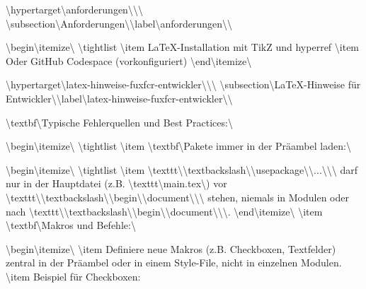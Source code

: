 \textbackslash{}hypertarget\textbackslash{}{anforderungen\textbackslash{}}\textbackslash{}{\textbackslash{}%
\textbackslash{}subsection\textbackslash{}{Anforderungen\textbackslash{}}\textbackslash{}label\textbackslash{}{anforderungen\textbackslash{}}\textbackslash{}}

\textbackslash{}begin\textbackslash{}{itemize\textbackslash{}}
\textbackslash{}tightlist
\textbackslash{}item
  LaTeX-Installation mit TikZ und hyperref
\textbackslash{}item
  Oder GitHub Codespace (vorkonfiguriert)
\textbackslash{}end\textbackslash{}{itemize\textbackslash{}}

\textbackslash{}hypertarget\textbackslash{}{latex-hinweise-fuxfcr-entwickler\textbackslash{}}\textbackslash{}{\textbackslash{}%
\textbackslash{}subsection\textbackslash{}{LaTeX-Hinweise für Entwickler\textbackslash{}}\textbackslash{}label\textbackslash{}{latex-hinweise-fuxfcr-entwickler\textbackslash{}}\textbackslash{}}

\textbackslash{}textbf\textbackslash{}{Typische Fehlerquellen und Best Practices:\textbackslash{}}

\textbackslash{}begin\textbackslash{}{itemize\textbackslash{}}
\textbackslash{}tightlist
\textbackslash{}item
  \textbackslash{}textbf\textbackslash{}{Pakete immer in der Präambel laden:\textbackslash{}}

  \textbackslash{}begin\textbackslash{}{itemize\textbackslash{}}
  \textbackslash{}tightlist
  \textbackslash{}item
    \textbackslash{}texttt\textbackslash{}{\textbackslash{}textbackslash\textbackslash{}{\textbackslash{}}usepackage\textbackslash{}\textbackslash{}{...\textbackslash{}\textbackslash{}}\textbackslash{}} darf nur in der Hauptdatei (z.B. \textbackslash{}texttt\textbackslash{}{main.tex\textbackslash{}}) vor \textbackslash{}texttt\textbackslash{}{\textbackslash{}textbackslash\textbackslash{}{\textbackslash{}}begin\textbackslash{}\textbackslash{}{document\textbackslash{}\textbackslash{}}\textbackslash{}} stehen, niemals in Modulen oder nach \textbackslash{}texttt\textbackslash{}{\textbackslash{}textbackslash\textbackslash{}{\textbackslash{}}begin\textbackslash{}\textbackslash{}{document\textbackslash{}\textbackslash{}}\textbackslash{}}.
  \textbackslash{}end\textbackslash{}{itemize\textbackslash{}}
\textbackslash{}item
  \textbackslash{}textbf\textbackslash{}{Makros und Befehle:\textbackslash{}}

  \textbackslash{}begin\textbackslash{}{itemize\textbackslash{}}
  \textbackslash{}item
    Definiere neue Makros (z.B. Checkboxen, Textfelder) zentral in der Präambel oder in einem Style-File, nicht in einzelnen Modulen.
  \textbackslash{}item
    Beispiel für Checkboxen:

